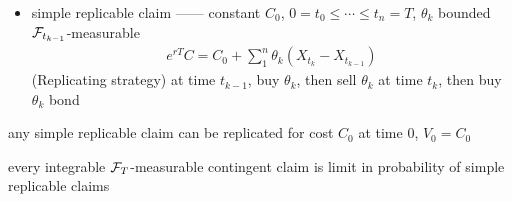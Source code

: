 \begin{itemize}
    \item simple replicable claim ------ constant $C_0$,
     $0 = t_0 \leq \cdots \leq t_n = T$, $\theta_k$ bounded $\mathcal{F}_{t_{k-1}}$-measurable
    \begin{align*}
        e^{rT}C = C_0 + \sum^n_1 \theta_k (X_{t_k} - X_{t_{k-1}})
    \end{align*}
    (Replicating strategy) at time $t_{k-1}$, buy $\theta_k$, then sell $\theta_k$ at time $t_k$, then buy $\theta_k$ bond
\end{itemize}

\begin{fact}
    any simple replicable claim can be replicated for cost $C_0$ at time 0, $V_0 = C_0$
\end{fact}

\begin{fact}
    every integrable $\mathcal{F}_T$-measurable contingent claim is limit in probability of simple replicable claims
\end{fact}

